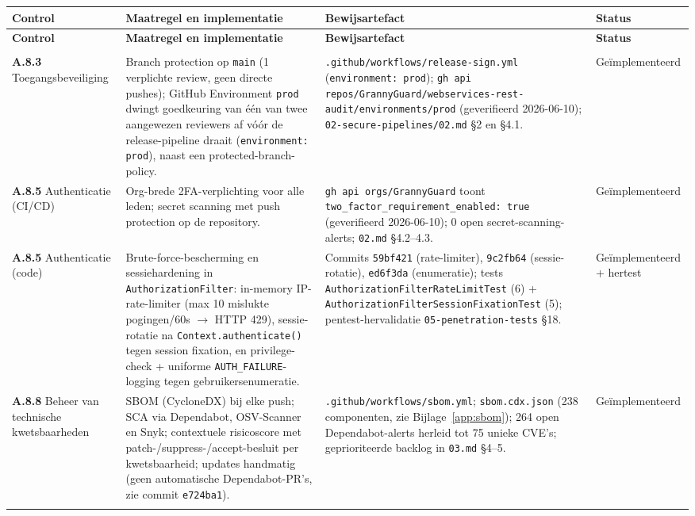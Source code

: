 \documentclass[12pt, a4paper]{report}
\begin{document}
{\small
\begin{longtable}{@{}
    >{\raggedright\arraybackslash}p{2.0cm}
    >{\raggedright\arraybackslash}p{4.3cm}
    >{\raggedright\arraybackslash}p{6.2cm}
    >{\raggedright\arraybackslash}p{2.0cm}@{}}
\toprule
\textbf{Control} & \textbf{Maatregel en implementatie} &
\textbf{Bewijsartefact} & \textbf{Status} \\
\midrule
\endfirsthead
\toprule
\textbf{Control} & \textbf{Maatregel en implementatie} &
\textbf{Bewijsartefact} & \textbf{Status} \\
\midrule
\endhead
\midrule
\multicolumn{4}{r}{\emph{vervolgt op volgende pagina}} \\
\endfoot
\bottomrule
\endlastfoot

\textbf{A.8.3} Toegangs\-beveiliging &
Branch protection op \texttt{main} (1 verplichte review, geen directe
pushes); GitHub Environment \texttt{prod} dwingt goedkeuring van één van twee
aangewezen reviewers af vóór de release-pipeline draait (\texttt{environment:
prod}), naast een protected-branch-policy. &
\texttt{.github/workflows/release-sign.yml} (\texttt{environment: prod});
\texttt{gh api repos/GrannyGuard/webservices-rest-audit/environments/prod}
(geverifieerd 2026-06-10); \texttt{02-secure-pipelines/02.md} \S2 en \S4.1. &
Geïmplementeerd \\
\addlinespace

\textbf{A.8.5} Authenticatie (CI/CD) &
Org-brede 2FA-verplichting voor alle leden; secret scanning met push
protection op de repository. &
\texttt{gh api orgs/GrannyGuard} toont
\texttt{two\_factor\_requirement\_enabled: true} (geverifieerd 2026-06-10);
0 open secret-scanning-alerts; \texttt{02.md} \S4.2--4.3. &
Geïmplementeerd \\
\addlinespace

\textbf{A.8.5} Authenticatie (code) &
Brute-force-bescherming en sessiehardening in \texttt{AuthorizationFilter}:
in-memory IP-rate-limiter (max 10 mislukte pogingen/60s $\to$ HTTP 429),
sessie-rotatie na \texttt{Context.authenticate()} tegen session fixation, en
privilege-check + uniforme \texttt{AUTH\_FAILURE}-logging tegen
gebruikersenumeratie. &
Commits \texttt{59bf421} (rate-limiter), \texttt{9c2fb64} (sessie-rotatie),
\texttt{ed6f3da} (enumeratie); tests \texttt{AuthorizationFilterRateLimitTest}
(6) + \texttt{AuthorizationFilterSessionFixationTest} (5); pentest-hervalidatie
\texttt{05-penetration-tests} \S18. &
Geïmplementeerd + hertest \\
\addlinespace

\textbf{A.8.8} Beheer van technische kwetsbaarheden &
SBOM (CycloneDX) bij elke push; SCA via Dependabot, OSV-Scanner en Snyk;
contextuele risicoscore met patch-/suppress-/accept-besluit per
kwetsbaarheid; updates handmatig (geen automatische Dependabot-PR's, zie
commit \texttt{e724ba1}). &
\texttt{.github/workflows/sbom.yml}; \texttt{sbom.cdx.json}
(238 componenten, zie Bijlage~\ref{app:sbom}); 264 open Dependabot-alerts
herleid tot 75 unieke CVE's; geprioriteerde backlog in \texttt{03.md}
\S4--5. &
Geïmplementeerd \\
\addlinespace


\end{longtable}}
\end{document}

